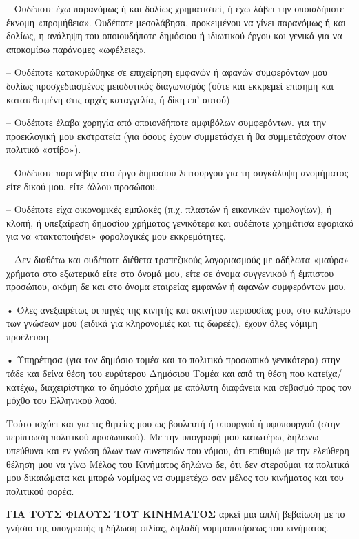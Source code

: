 \documentclass[a4paper]{article}
\begin{document}
– Ουδέποτε έχω παρανόμως ή και δολίως χρηματιστεί, ή έχω λάβει την οποιαδήποτε έκνομη «προμήθεια». Ουδέποτε μεσολάβησα, προκειμένου να γίνει παρανόμως ή και δολίως, η ανάληψη του οποιουδήποτε δημόσιου ή ιδιωτικού έργου και γενικά για να αποκομίσω παράνομες «ωφέλειες».

– Ουδέποτε κατακυρώθηκε σε επιχείρηση εμφανών ή αφανών συμφερόντων μου δολίως προσχεδιασμένος μειοδοτικός διαγωνισμός (ούτε και εκκρεμεί επίσημη και κατατεθειμένη στις αρχές καταγγελία, ή δίκη επ’ αυτού) 

– Ουδέποτε έλαβα χορηγία από οποιονδήποτε αμφιβόλων συμφερόντων. για την προεκλογική μου εκστρατεία (για όσους έχουν συμμετάσχει ή θα συμμετάσχουν στον πολιτικό «στίβο»).

– Ουδέποτε παρενέβην στο έργο δημοσίου λειτουργού για τη συγκάλυψη ανομήματος είτε δικού μου, είτε άλλου προσώπου.

– Ουδέποτε είχα οικονομικές εμπλοκές (π.χ. πλαστών ή εικονικών τιμολογίων), ή κλοπή, ή υπεξαίρεση δημοσίου χρήματος γενικότερα και ουδέποτε χρημάτισα εφοριακό για να «τακτοποιήσει» φορολογικές μου εκκρεμότητες.

– Δεν διαθέτω και ουδέποτε διέθετα τραπεζικούς λογαριασμούς με αδήλωτα «μαύρα» χρήματα στο εξωτερικό είτε στο όνομά μου, είτε σε όνομα συγγενικού ή έμπιστου προσώπου, ακόμη δε και στο όνομα εταιρείας εμφανών ή αφανών συμφερόντων μου.

• Όλες ανεξαιρέτως οι πηγές της κινητής και ακινήτου περιουσίας μου, στο καλύτερο των γνώσεων μου (ειδικά για κληρονομιές και τις δωρεές), έχουν όλες νόμιμη προέλευση.

• Υπηρέτησα (για τον δημόσιο τομέα και το πολιτικό προσωπικό γενικότερα) στην τάδε και δείνα θέση του ευρύτερου Δημόσιου Τομέα και από τη θέση που κατείχα/κατέχω, διαχειρίστηκα το δημόσιο χρήμα με απόλυτη διαφάνεια και σεβασμό προς τον μόχθο του Ελληνικού λαού.

Τούτο ισχύει και για τις θητείες μου ως βουλευτή ή υπουργού ή υφυπουργού (στην περίπτωση πολιτικού προσωπικού).
Με την υπογραφή μου κατωτέρω, δηλώνω υπεύθυνα και εν γνώση όλων των συνεπειών του νόμου, ότι επιθυμώ με την ελεύθερη θέληση μου να γίνω Μέλος του Κινήματος δηλώνω δε, ότι δεν στερούμαι τα πολιτικά μου δικαιώματα και μπορώ νομίμως να συμμετέχω σαν μέλος του κινήματος και του πολιτικού φορέα.

\textbf{ΓΙΑ ΤΟΥΣ ΦΙΛΟΥΣ ΤΟΥ ΚΙΝΗΜΑΤΟΣ} αρκεί μια απλή βεβαίωση με το γνήσιο της υπογραφής η δήλωση φιλίας, δηλαδή νομιμοποιήσεως του κινήματος.
\end{document}
